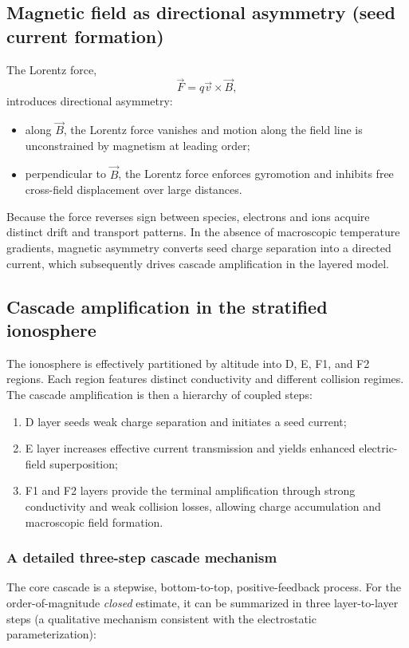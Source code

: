 \documentclass[11pt,a4paper]{article}
\begin{document}
\subsection{Magnetic field as directional asymmetry (seed current formation)}
The Lorentz force,
\begin{equation}
\vec F = q\vec v\times \vec B,
\end{equation}
introduces directional asymmetry:
\begin{itemize}
  \item along $\vec B$, the Lorentz force vanishes and motion along the field line is unconstrained by magnetism at leading order;
  \item perpendicular to $\vec B$, the Lorentz force enforces gyromotion and inhibits free cross-field displacement over large distances.
\end{itemize}
Because the force reverses sign between species, electrons and ions acquire distinct drift and transport patterns. In the absence of macroscopic temperature gradients, magnetic asymmetry converts seed charge separation into a directed current, which subsequently drives cascade amplification in the layered model.

\subsection{Cascade amplification in the stratified ionosphere}
The ionosphere is effectively partitioned by altitude into D, E, F1, and F2 regions. Each region features distinct conductivity and different collision regimes. The cascade amplification is then a hierarchy of coupled steps:
\begin{enumerate}
  \item D layer seeds weak charge separation and initiates a seed current;
  \item E layer increases effective current transmission and yields enhanced electric-field superposition;
  \item F1 and F2 layers provide the terminal amplification through strong conductivity and weak collision losses, allowing charge accumulation and macroscopic field formation.
\end{enumerate}

\subsubsection{A detailed three-step cascade mechanism}
The core cascade is a stepwise, bottom-to-top, positive-feedback process. For the order-of-magnitude \emph{closed} estimate, it can be summarized in three layer-to-layer steps (a qualitative mechanism consistent with the electrostatic parameterization):
\end{document}
